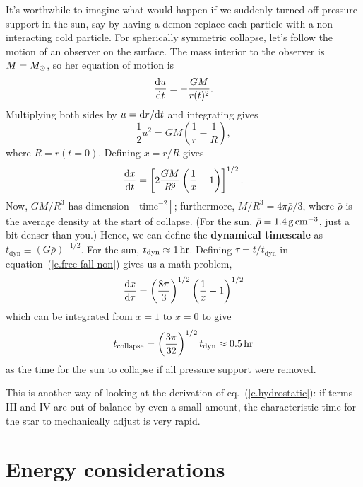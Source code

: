 It's worthwhile to imagine what would happen if we suddenly turned off pressure support in the sun, say by having a demon replace each particle with a non-interacting cold particle. For spherically symmetric collapse, let's follow the motion of an observer on the surface.  The mass interior to the observer is $M = M_\odot$, so her equation of motion is
\begin{equation}\label{e.free-fall-eq-motion}
\frac{\mathrm{d} u}{\mathrm{d} t} = -\frac{GM}{r(t)^{2}}.
\end{equation}
Multiplying both sides by $u = \mathrm{d} r/\mathrm{d} t$ and integrating gives
\[
\frac{1}{2} u^{2} = GM\left(\frac{1}{r} - \frac{1}{R}\right),
\]
where $R = r(t=0)$. Defining $x = r/R$ gives
\begin{equation}\label{e.free-fall-non}
\frac{\mathrm{d} x}{\mathrm{d} t} = \left[2 \frac{GM}{R^{3}}\left(\frac{1}{x}-1\right)\right]^{1/2}.
\end{equation}
Now, $GM/R^{3}$ has dimension $[\textrm{time}^{-2}]$; furthermore, $M/R^{3} = 4\pi\bar{\rho}/3$, where $\bar{\rho}$ is the average density at the start of collapse.  (For the sun, $\bar{\rho} = 1.4\,\mathrm{g}\,{\mathrm{c}\mathrm{m}}^{-3}$, just a bit denser than you.) Hence, we can define the \textbf{dynamical timescale} as $t_{\mathrm{dyn}}\equiv (G\bar{\rho})^{-1/2}$.  For the sun, $t_{\mathrm{dyn}}\approx 1\,\mathrm{hr}$.  Defining $\tau = t/t_{\mathrm{dyn}}$ in equation~(\ref{e.free-fall-non}) gives us a math problem,
\[
\frac{\mathrm{d} x}{\mathrm{d}\tau} = \left(\frac{8\pi}{3}\right)^{1/2}\left(\frac{1}{x}-1\right)^{1/2}
\]
which can be integrated from $x = 1$ to $x=0$ to give
\[
t_{\mathrm{collapse}} = \left(\frac{3\pi}{32}\right)^{1/2}t_{\mathrm{dyn}} \approx 0.5\,\mathrm{hr}
\]
as the time for the sun to collapse if all pressure support were removed.

This is another way of looking at the derivation of eq.~(\ref{e.hydrostatic}): if terms III and IV are out of balance by even a small amount, the characteristic time for the star to mechanically adjust is very rapid.

\section{Energy considerations}\label{s.energy-considerations}


